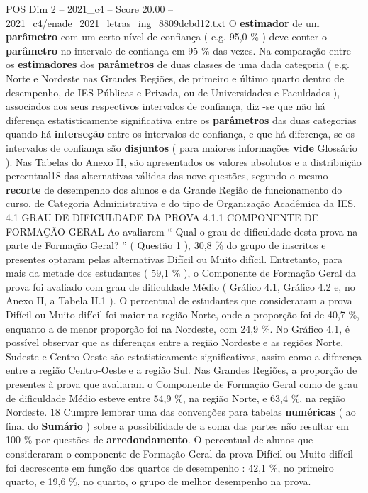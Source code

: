 \begin{textsample}{POS Dim 2 – 2021\_c4 – Score 20.00 – 2021\_c4/enade\_2021\_letras\_ing\_8809dcbd12.txt}
O \textbf{estimador} de um \textbf{parâmetro} com um certo nível de confiança ( e.g. 95,0 \% ) deve conter o \textbf{parâmetro} no intervalo de confiança em 95 \% das vezes.
Na comparação entre os \textbf{estimadores} dos \textbf{parâmetros} de duas classes de uma dada categoria ( e.g.
Norte e Nordeste nas Grandes Regiões, de primeiro e último quarto dentro de desempenho, de IES Públicas e Privada, ou de Universidades e Faculdades ), associados aos seus respectivos intervalos de confiança, diz -se que não há diferença estatisticamente significativa entre os \textbf{parâmetros} das duas categorias quando há \textbf{interseção} entre os intervalos de confiança, e que há diferença, se os intervalos de confiança são \textbf{disjuntos} ( para maiores informações \textbf{vide} Glossário ).
Nas Tabelas do Anexo II, são apresentados os valores absolutos e a distribuição percentual18 das alternativas válidas das nove questões, segundo o mesmo \textbf{recorte} de desempenho dos alunos e da Grande Região de funcionamento do curso, de Categoria Administrativa e do tipo de Organização Acadêmica da IES. 4.1 GRAU DE DIFICULDADE DA PROVA 4.1.1 COMPONENTE DE FORMAÇÃO GERAL Ao avaliarem “ Qual o grau de dificuldade desta prova na parte de Formação Geral? ” ( Questão 1 ), 30,8 \% do grupo de inscritos e presentes optaram pelas alternativas Difícil ou Muito difícil.
Entretanto, para mais da metade dos estudantes ( 59,1 \% ), o Componente de Formação Geral da prova foi avaliado com grau de dificuldade Médio ( Gráfico 4.1, Gráfico 4.2 e, no Anexo II, a Tabela II.1 ).
O percentual de estudantes que consideraram a prova Difícil ou Muito difícil foi maior na região Norte, onde a proporção foi de 40,7 \%, enquanto a de menor proporção foi na Nordeste, com 24,9 \%.
No Gráfico 4.1, é possível observar que as diferenças entre a região Nordeste e as regiões Norte, Sudeste e Centro-Oeste são estatisticamente significativas, assim como a diferença entre a região Centro-Oeste e a região Sul.
Nas Grandes Regiões, a proporção de presentes à prova que avaliaram o Componente de Formação Geral como de grau de dificuldade Médio esteve entre 54,9 \%, na região Norte, e 63,4 \%, na região Nordeste. 18 Cumpre lembrar uma das convenções para tabelas \textbf{numéricas} ( ao final do \textbf{Sumário} ) sobre a possibilidade de a soma das partes não resultar em 100 \% por questões de \textbf{arredondamento}.
O percentual de alunos que consideraram o componente de Formação Geral da prova Difícil ou Muito difícil foi decrescente em função dos quartos de desempenho : 42,1 \%, no primeiro quarto, e 19,6 \%, no quarto, o grupo de melhor desempenho na prova.

\end{textsample}

